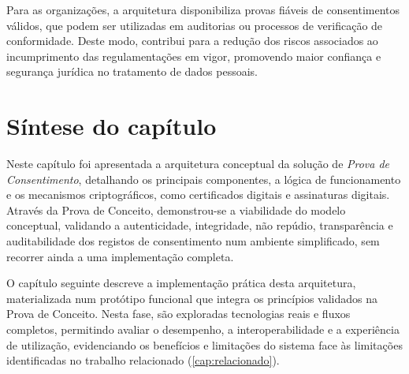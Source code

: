 Para as organizações, a arquitetura disponibiliza provas fiáveis de consentimentos válidos, que podem ser utilizadas em auditorias ou processos de verificação de conformidade.
Deste modo, contribui para a redução dos riscos associados ao incumprimento das regulamentações em vigor, promovendo maior confiança e segurança jurídica no tratamento de dados pessoais.

\section{Síntese do capítulo}

Neste capítulo foi apresentada a arquitetura conceptual da solução de \textit{Prova de Consentimento}, detalhando os principais componentes, a lógica de funcionamento e os mecanismos criptográficos, como certificados digitais e assinaturas digitais. Através da Prova de Conceito, demonstrou-se a viabilidade do modelo conceptual, validando a autenticidade, integridade, não repúdio, transparência e auditabilidade dos registos de consentimento num ambiente simplificado, sem recorrer ainda a uma implementação completa.

O capítulo seguinte descreve a implementação prática desta arquitetura, materializada num protótipo funcional que integra os princípios validados na Prova de Conceito. Nesta fase, são exploradas tecnologias reais e fluxos completos, permitindo avaliar o desempenho, a interoperabilidade e a experiência de utilização, evidenciando os benefícios e limitações do sistema face às limitações identificadas no trabalho relacionado (\ref{cap:relacionado}).
